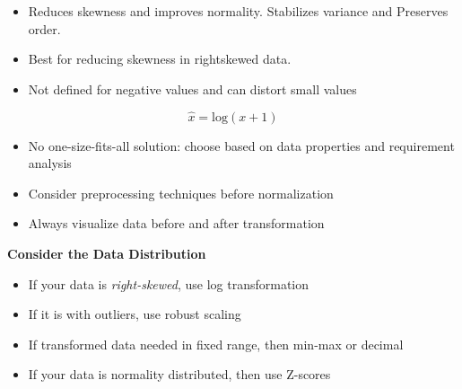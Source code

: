 \documentclass{article}
\begin{document}
\begin{itemize}
    \item Reduces skewness and improves normality. Stabilizes variance and Preserves order.
    \item Best for reducing skewness in rightskewed data.
    \item Not defined for negative values and can distort small values
\end{itemize}
\[
\hat{x} = \text{log}(x + 1)
\]

\begin{itemize}
    \item No one-size-fits-all solution: choose based on data properties and requirement analysis
    \item Consider preprocessing techniques before normalization
    \item Always visualize data before and after transformation
\end{itemize}

\textbf{Consider the Data Distribution}
\begin{itemize}
    \item If your data is \textit{right-skewed}, use log transformation
    \item If it is with outliers, use robust scaling
    \item If transformed data needed in fixed range, then min-max or decimal
    \item If your data is normality distributed, then use Z-scores
\end{itemize}
\end{document}
